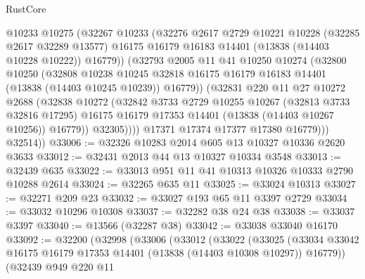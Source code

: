 \begin{lexlean}{RustCore}
\begin{coremodule}
                  @10233
                  @10275
                  (@32267
                    @10233
                    (@32276
                      @2617
                      @2729
                      @10221
                      @10228
                      (@32285 @2617 @32289 @13577)
                      @16175
                      @16179
                      @16183
                      @14401
                      (@13838 (@14403 @10228 @10222))
                      @16779))
                  (@32793
                    @2005
                    @11
                    @41
                    @10250
                    @10274
                    (@32800
                      @10250
                      (@32808
                        @10238
                        @10245
                        @32818
                        @16175
                        @16179
                        @16183
                        @14401
                        (@13838 (@14403 @10245 @10239))
                        @16779))
                    (@32831
                      @220
                      @11
                      @27
                      @10272
                      @2688
                      (@32838
                        @10272
                        (@32842
                          @3733
                          @2729
                          @10255
                          @10267
                          (@32813 @3733 @32816 @17295)
                          @16175
                          @16179
                          @17353
                          @14401
                          (@13838 (@14403 @10267 @10256))
                          @16779))
                      @32305))))
              @17371
              @17374
              @17377
              @17380
              @16779)))
        @32514))
@33006 := @32326 @10283 @2014 @605 @13 @10327 @10336 @2620 @3633
@33012 := @32431 @2013 @44 @13 @10327 @10334 @3548
@33013 := @32439 @635
@33022 := @33013 @951 @11 @41 @10313 @10326 @10333 @2790 @10288 @2614
@33024 := @32265 @635 @11
@33025 := @33024 @10313
@33027 := @32271 @209 @23
@33032 := @33027 @193 @65 @11 @3397 @2729
@33034 := @33032 @10296 @10308
@33037 := @32282 @38 @24 @38
@33038 := @33037 @3397
@33040 := @13566 (@32287 @38)
@33042 := @33038 @33040 @16170
@33092 := @32200
    (@32998
      (@33006
        (@33012
          (@33022
            (@33025
              (@33034 @33042 @16175 @16179 @17353 @14401 (@13838 (@14403 @10308 @10297)) @16779))
            (@32439
              @949
              @220
              @11

\end{coremodule}
\end{lexlean}
